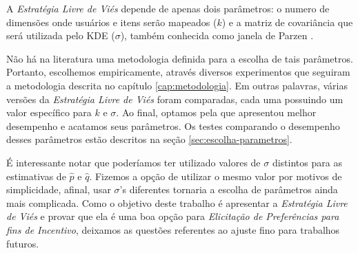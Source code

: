A \textit{Estratégia Livre de Viés} depende de apenas dois parâmetros: o numero de dimensões onde usuários e itens serão mapeados ($k$) e a matriz de covariância que será utilizada pelo KDE ($\sigma$), também conhecida como janela de Parzen \citep{Duda:2000:PC:954544}. 

Não há na literatura uma metodologia definida para a escolha de tais parâmetros. Portanto, escolhemos empiricamente, através diversos experimentos que seguiram a metodologia descrita no capítulo \ref{cap:metodologia}. Em outras palavras, várias versões da \textit{Estratégia Livre de Viés} foram comparadas, cada uma possuindo um valor específico para $k$ e $\sigma$. Ao final, optamos pela que apresentou melhor desempenho e acatamos seus parâmetros. Os testes comparando o desempenho desses parâmetros estão descritos na seção \ref{sec:escolha-parametros}.

É interessante notar que poderíamos ter utilizado valores de $\sigma$ distintos para as estimativas de $\hat{p}$ e $\hat{q}$. Fizemos a opção de utilizar o mesmo valor por motivos de simplicidade, afinal, usar $\sigma$'s diferentes tornaria a escolha de parâmetros ainda mais complicada. Como o objetivo deste trabalho é apresentar a \textit{Estratégia Livre de Viés} e provar que ela é uma boa opção para \textit{Elicitação de Preferências para fins de Incentivo}, deixamos as questões referentes ao ajuste fino para trabalhos futuros.

